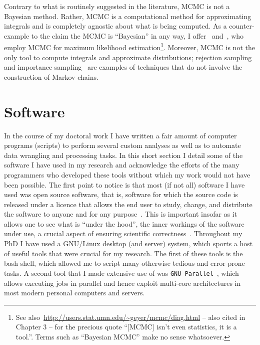 Contrary to what is routinely suggested in the literature, MCMC is not a Bayesian method.
Rather, MCMC is a computational method for approximating integrals and is completely agnostic about what is being computed.
As a counter-example to the claim the MCMC is ``Bayesian'' in any way, I offer~\cite{Geyer1991} and~\cite{Kuhner1998}, who employ MCMC for maximum likelihood estimation\footnote{See also~\url{http://users.stat.umn.edu/~geyer/mcmc/diag.html} -- also cited in Chapter 3 -- for the precious quote ``[MCMC] isn't even statistics, it is a tool.''. Terms such as ``Bayesian MCMC'' make no sense whatsoever. }.
Moreover, MCMC is not the only tool to compute integrals and approximate distributions; rejection sampling~\citep{Casella2004} and importance sampling~\citep{Rubinstein2016} are examples of techniques that do not involve the construction of Markov chains.

\section{Software}
\label{sec:software}

In the course of my doctoral work I have written a fair amount of computer programs (scripts) to perform several custom analyses as well as to automate data wrangling and processing tasks.
In this short section I detail some of the software I have used in my research and acknowledge the efforts of the many programmers who developed these tools without which my work would not have been possible.
The first point to notice is that most (if not all) software I have used was open source software, that is, software for which the source code is released under a licence that allows the end user to study, change, and distribute the software to anyone and for any purpose~\citep{Laurent2004}.
This is important insofar as it allows one to see what is ``under the hood'', the inner workings of the software under use, a crucial aspect of ensuring scientific correctness~\citep{Darriba2018}.
Throughout my PhD I have used a GNU/Linux desktop (and server) system, which sports a host of useful tools that were crucial for my research.
The first of these tools is the bash shell, which allowed me to script many otherwise tedious and error-prone tasks.
A second tool that I made extensive use of was \verb|GNU Parallel|~\citep{Tange2011}, which allows executing jobs in parallel and hence exploit multi-core architectures in most modern personal computers and servers.

